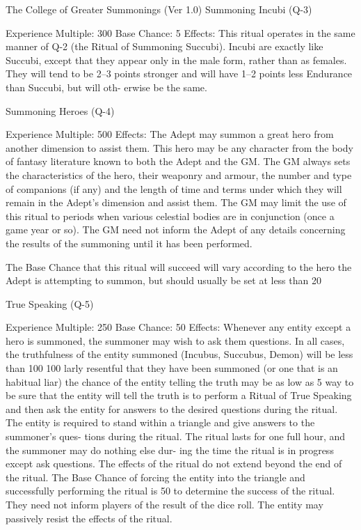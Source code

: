 \begin{Chapter}{The College of Greater Summonings (Ver 1.0)}
Summoning Incubi (Q-3) 

Experience Multiple: 300 
Base Chance: 5%
Effects: This ritual operates in the same manner of 
Q-2 (the Ritual of Summoning Succubi). Incubi are 
exactly  like  Succubi,  except  that  they  appear  only 
in the male form, rather than as females. They will 
tend  to  be  2–3  points  stronger  and  will  have  1–2 
points  less  Endurance  than  Succubi,  but  will  oth-
erwise be the same. 

Summoning Heroes (Q-4) 

Experience Multiple: 500 
Effects: The Adept may summon a great hero from 
another dimension to assist them. This hero may be 
any  character  from  the  body  of  fantasy  literature 
known  to  both  the  Adept  and  the  GM.  The  GM 
always  sets  the  characteristics  of  the  hero,  their 
weaponry  and  armour,  the  number  and  type  of 
companions  (if  any)  and  the  length  of  time  and 
terms under which they will remain in the Adept’s 
dimension and assist them. The GM  may limit the 
use  of  this  ritual  to  periods  when  various  celestial 
bodies are in conjunction (once a game year or so). 
The  GM  need  not inform the  Adept of  any  details 
concerning  the  results  of  the  summoning  until  it 
has been performed. 

The  Base  Chance  that  this  ritual  will  succeed  will 
vary according to the hero the Adept is attempting 
to  summon,  but  should  usually  be  set  at  less  than 
20%

True Speaking (Q-5) 

Experience Multiple: 250 
Base Chance: 50%
Effects:  Whenever  any  entity  except  a  hero  is 
summoned,  the  summoner  may  wish  to  ask  them 
questions. In all cases, the truthfulness of the entity 
summoned  (Incubus,  Succubus,  Demon)  will  be 
less  than  100%
100%
larly  resentful  that  they  have  been  summoned  (or 
one that is an habitual liar) the chance of the entity 
telling  the  truth  may  be  as  low  as  5%
way to be sure that the entity will tell the truth is to 
perform a Ritual of True Speaking and then ask the 
entity  for  answers  to  the  desired  questions  during 
the  ritual.  The  entity  is  required  to  stand  within  a 
triangle and give answers to the summoner’s ques-
tions during  the  ritual.  The  ritual  lasts  for  one  full 
hour,  and  the  summoner  may  do nothing  else  dur-
ing  the  time  the  ritual  is  in  progress  except  ask 
questions.  The  effects  of  the  ritual  do  not  extend 
beyond  the  end  of  the  ritual.  The  Base  Chance  of 
forcing the entity into the triangle and successfully 
performing  the  ritual  is  50%
to  determine  the  success  of  the  ritual.  They  need 
not inform players of the result of the dice roll. The 
entity may passively resist the effects of the ritual. 


\end{Chapter}
